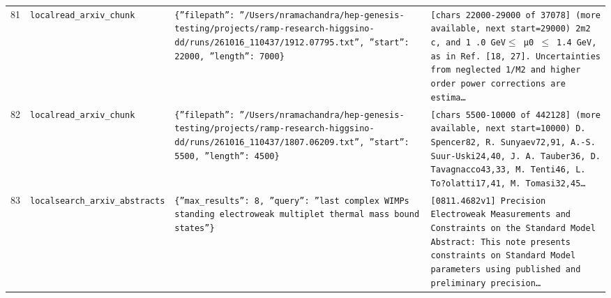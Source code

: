 \documentclass[11pt,a4paper]{article}
\begin{document}
\begin{longtable}{@{}p{}p{}p{}p{}@{}}
81 & \texttt{local}\newline\texttt{read\_\allowbreak{}arxiv\_\allowbreak{}chunk} & \texttt{\{''filepath'':\allowbreak{} ''/\allowbreak{}Users/\allowbreak{}nramachandra/\allowbreak{}hep-genesis-testing/\allowbreak{}projects/\allowbreak{}ramp-research-higgsino-dd/\allowbreak{}runs/\allowbreak{}261016\_\allowbreak{}110437/\allowbreak{}1912.07795.txt'',\allowbreak{} ''start'':\allowbreak{} 22000,\allowbreak{} ''length'':\allowbreak{} 7000\}\allowbreak{}} & \texttt{[chars 22000-29000 of 37078]\allowbreak{} (more available,\allowbreak{} next start=\allowbreak{}29000)\allowbreak{}  2m2 c,\allowbreak{} and 1 .0 GeV$\leq$ µ0 $\leq$ 1.4 GeV,\allowbreak{} as in Ref. [18,\allowbreak{} 27]\allowbreak{}. Uncertainties from neglected 1/\allowbreak{}M2 and higher order power corrections are estima\ldots{}\allowbreak{}} \\
82 & \texttt{local}\newline\texttt{read\_\allowbreak{}arxiv\_\allowbreak{}chunk} & \texttt{\{''filepath'':\allowbreak{} ''/\allowbreak{}Users/\allowbreak{}nramachandra/\allowbreak{}hep-genesis-testing/\allowbreak{}projects/\allowbreak{}ramp-research-higgsino-dd/\allowbreak{}runs/\allowbreak{}261016\_\allowbreak{}110437/\allowbreak{}1807.06209.txt'',\allowbreak{} ''start'':\allowbreak{} 5500,\allowbreak{} ''length'':\allowbreak{} 4500\}\allowbreak{}} & \texttt{[chars 5500-10000 of 442128]\allowbreak{} (more available,\allowbreak{} next start=\allowbreak{}10000)\allowbreak{}   D. Spencer82,\allowbreak{} R. Sunyaev72,\allowbreak{}91,\allowbreak{} A.-S. Suur-Uski24,\allowbreak{}40,\allowbreak{} J. A. Tauber36,\allowbreak{} D. Tavagnacco43,\allowbreak{}33,\allowbreak{} M. Tenti46,\allowbreak{} L. To?olatti17,\allowbreak{}41,\allowbreak{} M. Tomasi32,\allowbreak{}45\ldots{}\allowbreak{}} \\
83 & \texttt{local}\newline\texttt{search\_\allowbreak{}arxiv\_\allowbreak{}abstracts} & \texttt{\{''max\_\allowbreak{}results'':\allowbreak{} 8,\allowbreak{} ''query'':\allowbreak{} ''last complex WIMPs standing electroweak multiplet thermal mass bound states''\}\allowbreak{}} & \texttt{[0811.4682v1]\allowbreak{} Precision Electroweak Measurements and Constraints on the Standard Model Abstract:\allowbreak{}   This note presents constraints on Standard Model parameters using published and preliminary precision\ldots{}\allowbreak{}} \\

\end{longtable}
\end{document}

